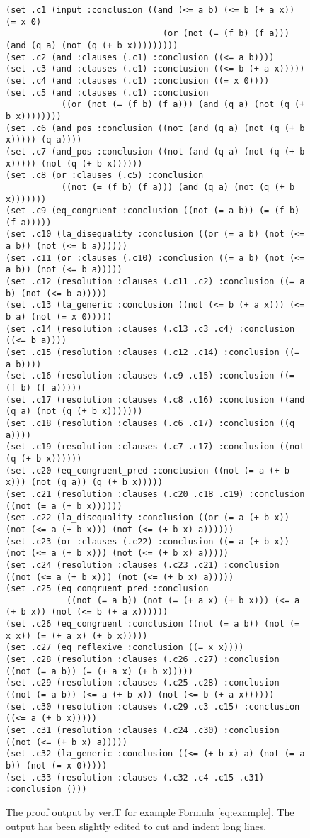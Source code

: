 \documentclass{llncs}
\begin{document}
\begin{figure}
{\scriptsize
\begin{verbatim}
(set .c1 (input :conclusion ((and (<= a b) (<= b (+ a x)) (= x 0)
                               (or (not (= (f b) (f a))) (and (q a) (not (q (+ b x)))))))))
(set .c2 (and :clauses (.c1) :conclusion ((<= a b))))
(set .c3 (and :clauses (.c1) :conclusion ((<= b (+ a x)))))
(set .c4 (and :clauses (.c1) :conclusion ((= x 0))))
(set .c5 (and :clauses (.c1) :conclusion
           ((or (not (= (f b) (f a))) (and (q a) (not (q (+ b x))))))))
(set .c6 (and_pos :conclusion ((not (and (q a) (not (q (+ b x))))) (q a))))
(set .c7 (and_pos :conclusion ((not (and (q a) (not (q (+ b x))))) (not (q (+ b x))))))
(set .c8 (or :clauses (.c5) :conclusion
           ((not (= (f b) (f a))) (and (q a) (not (q (+ b x)))))))
(set .c9 (eq_congruent :conclusion ((not (= a b)) (= (f b) (f a)))))
(set .c10 (la_disequality :conclusion ((or (= a b) (not (<= a b)) (not (<= b a))))))
(set .c11 (or :clauses (.c10) :conclusion ((= a b) (not (<= a b)) (not (<= b a)))))
(set .c12 (resolution :clauses (.c11 .c2) :conclusion ((= a b) (not (<= b a)))))
(set .c13 (la_generic :conclusion ((not (<= b (+ a x))) (<= b a) (not (= x 0)))))
(set .c14 (resolution :clauses (.c13 .c3 .c4) :conclusion ((<= b a))))
(set .c15 (resolution :clauses (.c12 .c14) :conclusion ((= a b))))
(set .c16 (resolution :clauses (.c9 .c15) :conclusion ((= (f b) (f a)))))
(set .c17 (resolution :clauses (.c8 .c16) :conclusion ((and (q a) (not (q (+ b x)))))))
(set .c18 (resolution :clauses (.c6 .c17) :conclusion ((q a))))
(set .c19 (resolution :clauses (.c7 .c17) :conclusion ((not (q (+ b x))))))
(set .c20 (eq_congruent_pred :conclusion ((not (= a (+ b x))) (not (q a)) (q (+ b x)))))
(set .c21 (resolution :clauses (.c20 .c18 .c19) :conclusion ((not (= a (+ b x))))))
(set .c22 (la_disequality :conclusion ((or (= a (+ b x)) (not (<= a (+ b x))) (not (<= (+ b x) a))))))
(set .c23 (or :clauses (.c22) :conclusion ((= a (+ b x)) (not (<= a (+ b x))) (not (<= (+ b x) a)))))
(set .c24 (resolution :clauses (.c23 .c21) :conclusion ((not (<= a (+ b x))) (not (<= (+ b x) a)))))
(set .c25 (eq_congruent_pred :conclusion
            ((not (= a b)) (not (= (+ a x) (+ b x))) (<= a (+ b x)) (not (<= b (+ a x))))))
(set .c26 (eq_congruent :conclusion ((not (= a b)) (not (= x x)) (= (+ a x) (+ b x)))))
(set .c27 (eq_reflexive :conclusion ((= x x))))
(set .c28 (resolution :clauses (.c26 .c27) :conclusion ((not (= a b)) (= (+ a x) (+ b x)))))
(set .c29 (resolution :clauses (.c25 .c28) :conclusion ((not (= a b)) (<= a (+ b x)) (not (<= b (+ a x))))))
(set .c30 (resolution :clauses (.c29 .c3 .c15) :conclusion ((<= a (+ b x)))))
(set .c31 (resolution :clauses (.c24 .c30) :conclusion ((not (<= (+ b x) a)))))
(set .c32 (la_generic :conclusion ((<= (+ b x) a) (not (= a b)) (not (= x 0)))))
(set .c33 (resolution :clauses (.c32 .c4 .c15 .c31) :conclusion ()))
\end{verbatim}
}
\caption{\label{fig:proofverit} The proof output by veriT for example Formula \ref{eq:example}.  The output has been slightly edited to cut and indent long lines.}
\end{figure}
\end{document}
